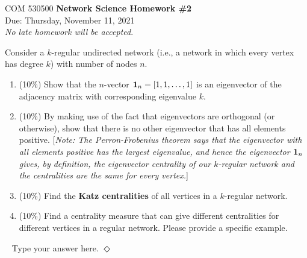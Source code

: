 \documentclass[12pt]{article}
\newcommand {\bsolution}{\noindent {\em Solution:} \ }
\newcommand{\esolution}{\hfill $\Diamond$ \\ \vspace{.3cm}}
\begin{document}
\thispagestyle{empty}
\begin{center}
{\Large \noindent COM 530500 {\bf Network Science Homework \#2} \\
\large {{\sc Due:} Thursday, November 11, 2021}  \\
}
\emph{No late homework will be accepted}.
\end{center}





\bigskip


 Consider a $k$-regular undirected network (i.e., a network in which every vertex has degree $k$) with number of nodes $n$.
\begin{enumerate}[label=(\alph*)]
	\item (10\%) Show that the $n$-vector ${\bf 1}_n = [1,1,\ldots,1]$ is an eigenvector of the adjacency matrix with corresponding eigenvalue $k$. 
	\item (10\%) By making use of the fact that eigenvectors are orthogonal (or otherwise), show that there is no other eigenvector that has all elements positive. [{\it Note: The Perron-Frobenius theorem says that the eigenvector with all elements positive has the largest eigenvalue, and hence the eigenvector ${\bf 1}_n$ gives, by definition, the eigenvector centrality of our $k$-regular network and the centralities are the same for every vertex.}]
	\item (10\%) Find the {\bf Katz centralities} of all vertices in a $k$-regular network.
	\item (10\%) Find a centrality measure that can give different centralities for different vertices in a regular network. Please provide a specific example.
\end{enumerate}

\bsolution
Type your answer here.
\esolution
\end{document}
